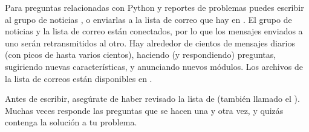 \documentclass[a5paper,10pt,spanish]{sphinxmanual}
\begin{document}
\sphinxAtStartPar
Para preguntas relacionadas con Python y reportes de problemas puedes escribir al grupo de noticias , o enviarlas a la lista de correo que hay en . El grupo de noticias y la lista de correo están conectados, por lo que los mensajes enviados a uno serán retransmitidos al otro.  Hay alrededor de cientos de mensajes diarios (con picos de hasta varios cientos), haciendo (y respondiendo) preguntas, sugiriendo nuevas características, y anunciando nuevos módulos. Los archivos de la lista de correos están disponibles en .

\sphinxAtStartPar
Antes de escribir, asegúrate de haber revisado la lista de  (también llamado el ). Muchas veces responde las preguntas que se hacen una y otra vez, y quizás contenga la solución a tu problema.

\renewcommand{\indexname}{Índice}
\printindex
\end{document}
